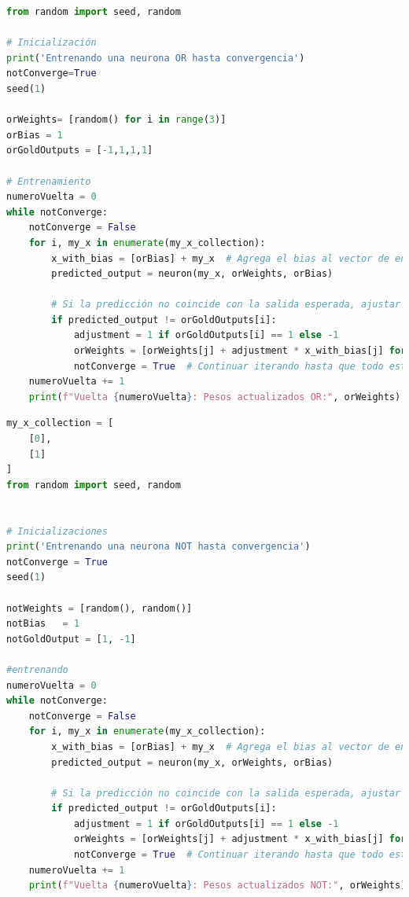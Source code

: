 \documentclass{report}
\begin{document}
        \clearpage
        \begin{lstlisting}[language=Python, caption=Implementación del perceptron para las puerta lógica OR]
from random import seed, random

# Inicialización
print('Entrenando una neurona OR hasta convergencia')
notConverge=True
seed(1)

orWeights= [random() for i in range(3)]
orBias = 1
orGoldOutputs = [-1,1,1,1]

# Entrenamiento
numeroVuelta = 0
while notConverge:
    notConverge = False
    for i, my_x in enumerate(my_x_collection):
        x_with_bias = [orBias] + my_x  # Agrega el bias al vector de entrada
        predicted_output = neuron(my_x, orWeights, orBias)
        
        # Si la predicción no coincide con la salida esperada, ajustar pesos
        if predicted_output != orGoldOutputs[i]:
            adjustment = 1 if orGoldOutputs[i] == 1 else -1
            orWeights = [orWeights[j] + adjustment * x_with_bias[j] for j in range(len(orWeights))]
            notConverge = True  # Continuar iterando hasta que todo esté correcto
    numeroVuelta += 1
    print(f"Vuelta {numeroVuelta}: Pesos actualizados OR:", orWeights)
        \end{lstlisting}
        \clearpage
        \begin{lstlisting}[language=Python, caption=Implementación del perceptron para las puerta lógica NOT]
my_x_collection = [
    [0],
    [1]
]
from random import seed, random


# Inicializaciones
print('Entrenando una neurona NOT hasta convergencia')
notConverge = True
seed(1)

notWeights = [random(), random()]
notBias   = 1
notGoldOutput = [1, -1]

#entrenando
numeroVuelta = 0
while notConverge:
    notConverge = False
    for i, my_x in enumerate(my_x_collection):
        x_with_bias = [orBias] + my_x  # Agrega el bias al vector de entrada
        predicted_output = neuron(my_x, orWeights, orBias)
        
        # Si la predicción no coincide con la salida esperada, ajustar pesos
        if predicted_output != orGoldOutputs[i]:
            adjustment = 1 if orGoldOutputs[i] == 1 else -1
            orWeights = [orWeights[j] + adjustment * x_with_bias[j] for j in range(len(orWeights))]
            notConverge = True  # Continuar iterando hasta que todo esté correcto
    numeroVuelta += 1
    print(f"Vuelta {numeroVuelta}: Pesos actualizados NOT:", orWeights)

        \end{lstlisting}
\end{document}
